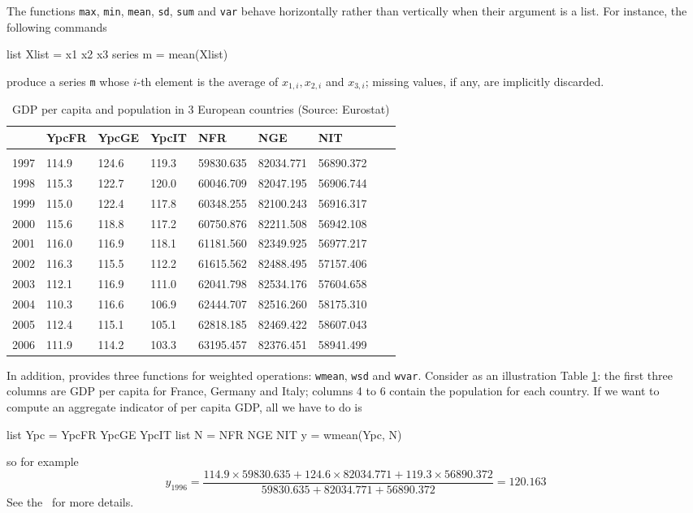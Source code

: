 The functions \texttt{max}, \texttt{min}, \texttt{mean}, \texttt{sd},
\texttt{sum} and \texttt{var} behave horizontally rather than
vertically when their argument is a list. For instance, the following
commands
\begin{code}
  list Xlist = x1 x2 x3
  series m = mean(Xlist)
\end{code}
produce a series \texttt{m} whose $i$-th element is the average of
$x_{1,i}, x_{2,i}$ and $x_{3,i}$; missing values, if any, are implicitly discarded.

\begin{table}
  \centering
  \begin{tabular}{lllllllll}
\hline
	& YpcFR & YpcGE	& YpcIT	& NFR		& NGE		& NIT        \\ 
\hline
\\ [-8pt]
1997	& 114.9 & 124.6	& 119.3	& 59830.635	& 82034.771	& 56890.372  \\ 
1998	& 115.3 & 122.7	& 120.0	& 60046.709	& 82047.195	& 56906.744  \\ 
1999	& 115.0	& 122.4	& 117.8	& 60348.255	& 82100.243	& 56916.317  \\ 
2000	& 115.6 & 118.8	& 117.2	& 60750.876	& 82211.508	& 56942.108  \\ 
2001	& 116.0	& 116.9	& 118.1	& 61181.560	& 82349.925	& 56977.217  \\ 
2002	& 116.3 & 115.5	& 112.2	& 61615.562	& 82488.495	& 57157.406  \\ 
2003	& 112.1 & 116.9	& 111.0	& 62041.798	& 82534.176	& 57604.658  \\ 
2004	& 110.3 & 116.6	& 106.9	& 62444.707	& 82516.260	& 58175.310  \\ 
2005	& 112.4 & 115.1	& 105.1	& 62818.185	& 82469.422	& 58607.043  \\ 
2006	& 111.9 & 114.2	& 103.3	& 63195.457	& 82376.451	& 58941.499  \\
\hline
  \end{tabular}
  \caption{GDP per capita and population in 3 European countries (Source: Eurostat)}
  \label{tab:EuroData}
\end{table}
In addition,  provides three functions for weighted
operations: \texttt{wmean}, \texttt{wsd} and \texttt{wvar}. Consider
as an illustration Table \ref{tab:EuroData}: the first three columns are GDP
per capita for France, Germany and Italy; columns 4 to 6 contain the
population for each country. If we want to compute an aggregate
indicator of per capita GDP, all we have to do is
\begin{code}
list Ypc = YpcFR YpcGE YpcIT
list N = NFR NGE NIT
y = wmean(Ypc, N)
\end{code}
so for example
\[
y_{1996} = \frac{114.9 \times 59830.635 + 124.6 \times 82034.771 +
  119.3 \times 56890.372} {59830.635 + 82034.771 + 56890.372} =
120.163
\]
See the \GCR\ for more details.

